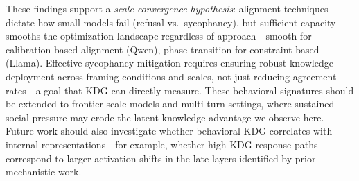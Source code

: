 \documentclass{article}
\begin{document}
These findings support a \emph{scale convergence hypothesis}: alignment techniques dictate how small models fail (refusal vs.\ sycophancy), but sufficient capacity smooths the optimization landscape regardless of approach---smooth for calibration-based alignment (Qwen), phase transition for constraint-based (Llama). Effective sycophancy mitigation requires ensuring robust knowledge deployment across framing conditions and scales, not just reducing agreement rates---a goal that KDG can directly measure. These behavioral signatures should be extended to frontier-scale models and multi-turn settings, where sustained social pressure may erode the latent-knowledge advantage we observe here. Future work should also investigate whether behavioral KDG correlates with internal representations---for example, whether high-KDG response paths correspond to larger activation shifts in the late layers identified by prior mechanistic work.


\end{document}
